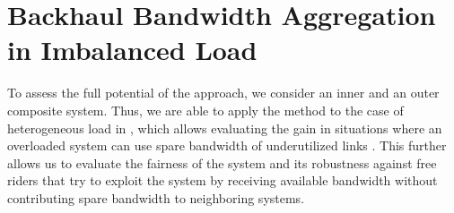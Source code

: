 \section{Backhaul Bandwidth Aggregation in Imbalanced Load}\label{sec:aggregation:imbalanced}

To assess the full potential of the approach, we consider an inner and an outer composite system. Thus, we are able to apply the method to the case of heterogeneous load in , which allows evaluating the gain in situations where an overloaded system can use spare bandwidth of underutilized links .
This further allows us to evaluate the fairness of the system and its robustness against free riders that try to exploit the system by receiving available bandwidth without contributing spare bandwidth to neighboring systems.



